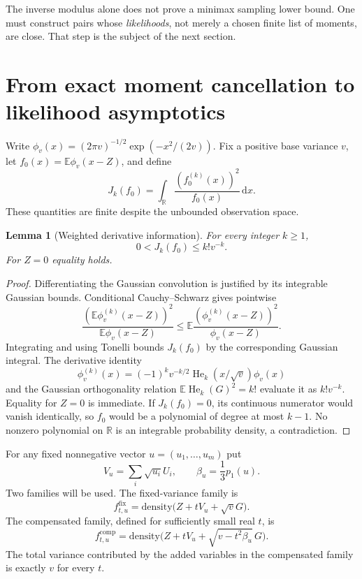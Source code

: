 \documentclass[11pt,a4paper]{article}
\numberwithin{equation}{section}
\newtheorem{lemma}[theorem]{Lemma}
\theoremstyle{definition}
\theoremstyle{remark}
\newcommand{\R}{\mathbb R}
\newcommand{\E}{\mathbb E}
\newcommand{\dd}{\,\mathrm d}
\newcommand{\He}{\operatorname{He}}
\begin{document}
The inverse modulus alone does not prove a minimax sampling lower bound. One
must construct pairs whose \emph{likelihoods}, not merely a chosen finite
list of moments, are close. That step is the subject of the next section.

\section{From exact moment cancellation to likelihood asymptotics}
\label{sec:likelihood}

Write $\phi_v(x)=(2\pi v)^{-1/2}\exp(-x^2/(2v))$. Fix a positive base variance
$v$, let $f_0(x)=\E\phi_v(x-Z)$, and define
\begin{equation}
 J_k(f_0)=\int_\R\frac{(f_0^{(k)}(x))^2}{f_0(x)}\dd x.
 \label{eq:J}
\end{equation}
These quantities are finite despite the unbounded observation space.

\begin{lemma}[Weighted derivative information]
\label{lem:J}
For every integer $k\ge1$,
\begin{equation}
 0<J_k(f_0)\le k!v^{-k}.
 \label{eq:Jbound}
\end{equation}
For $Z=0$ equality holds.
\end{lemma}
\begin{proof}
Differentiating the Gaussian convolution is justified by its integrable
Gaussian bounds. Conditional Cauchy--Schwarz gives pointwise
\[
 \frac{(\E\phi_v^{(k)}(x-Z))^2}{\E\phi_v(x-Z)}
 \le \E\frac{(\phi_v^{(k)}(x-Z))^2}{\phi_v(x-Z)}.
\]
Integrating and using Tonelli bounds $J_k(f_0)$ by the corresponding Gaussian
integral. The derivative identity
\[
 \phi_v^{(k)}(x)=(-1)^k v^{-k/2}\He_k(x/\sqrt v)\phi_v(x)
\]
and the Gaussian orthogonality relation $\E\He_k(G)^2=k!$ evaluate it as
$k!v^{-k}$. Equality for $Z=0$ is immediate. If $J_k(f_0)=0$, its continuous
numerator would vanish identically, so $f_0$ would be a polynomial of degree
at most $k-1$. No nonzero polynomial on $\R$ is an integrable probability
density, a contradiction.
\end{proof}

For any fixed nonnegative vector $u=(u_1,\ldots,u_m)$ put
\begin{equation}
 V_u=\sum_i\sqrt{u_i}U_i,\qquad \beta_u=\frac13p_1(u).
\end{equation}
Two families will be used. The fixed-variance family is
\begin{equation}
 f^{\mathrm{fix}}_{t,u}=\mathrm{density}\bigl(Z+tV_u+\sqrt vG\bigr).
 \label{eq:fixedfamily}
\end{equation}
The compensated family, defined for sufficiently small real $t$, is
\begin{equation}
 f^{\mathrm{comp}}_{t,u}
 =\mathrm{density}\bigl(Z+tV_u+\sqrt{v-t^2\beta_u}\,G\bigr).
 \label{eq:compfamily}
\end{equation}
The total variance contributed by the added variables in the compensated
family is exactly $v$ for every $t$.
\end{document}
